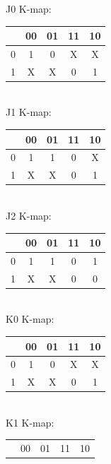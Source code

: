 \documentclass{article}
\begin{document}
 {
    J0 K-map: \\
    \begin{tabular}{|c|c|c|c|c|}
        \hline
          & 00 & 01 & 11 & 10 \\
        \hline
        0 & 1  & 0  & X  & X  \\
        \hline
        1 & X  & X  & 0  & 1  \\
        \hline
    \end{tabular} \\
    \linebreak
    J1 K-map: \\
    \begin{tabular}{|c|c|c|c|c|}
        \hline
          & 00 & 01 & 11 & 10 \\
        \hline
        0 & 1  & 1  & 0  & X  \\
        \hline
        1 & X  & X  & 0  & 1  \\
        \hline
    \end{tabular} \\
    \linebreak
    J2 K-map: \\
    \begin{tabular}{|c|c|c|c|c|}
        \hline
          & 00 & 01 & 11 & 10 \\
        \hline
        0 & 1  & 1  & 0  & 1  \\
        \hline
        1 & X  & X  & 0  & 0  \\
        \hline
    \end{tabular} \\
    \linebreak
    K0 K-map: \\
    \begin{tabular}{|c|c|c|c|c|}
        \hline
          & 00 & 01 & 11 & 10 \\
        \hline
        0 & 1  & 0  & X  & X  \\
        \hline
        1 & X  & X  & 0  & 1  \\
        \hline
    \end{tabular} \\
    \linebreak
    K1 K-map: \\
    \begin{tabular}{|c|c|c|c|c|}
        \hline
          & 00 & 01 & 11 & 10 \\

\end{tabular}}
\end{document}
